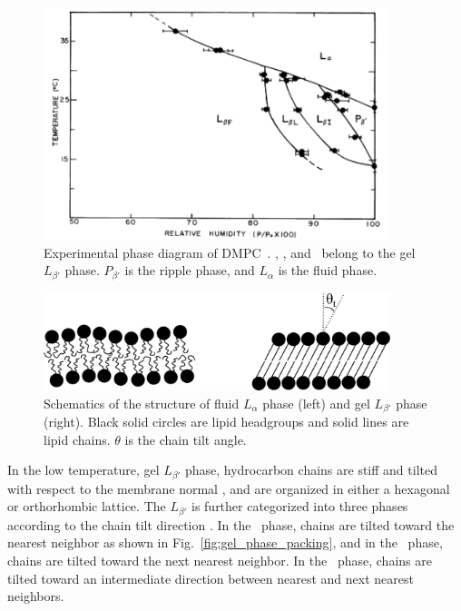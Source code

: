 \begin{figure}[htbp]
  \centering
  \includegraphics[width=0.9\textwidth]{figures/smith_phase_diagram}
  \caption{Experimental phase diagram of DMPC~\cite{ref:Smith88}.
  \LbetaI, \LbetaL, and \LbetaF\ belong to the gel $L_{\beta'}$ phase. $P_{\beta'}$ is 
  the ripple phase, and $L_\alpha$ is the fluid phase.}
  \label{fig:phase_diagram}
\end{figure}

\begin{figure}[htbp]
  \centering
  \includegraphics[width=0.9\textwidth]{figures/various_phases}
  \caption[]{Schematics of the structure of fluid $L_\alpha$ phase (left) and 
  gel $L_{\beta'}$ phase (right). Black solid circles are lipid headgroups 
  and solid lines are lipid chains. $\theta$ is the chain tilt angle.}
  \label{fig:various_phases}
\end{figure}

In the low temperature, gel $L_{\beta'}$
phase, hydrocarbon chains are stiff and tilted with respect to the membrane
normal \cite{ref:Tardieu73}, and are organized in either a hexagonal 
or orthorhombic lattice. 
The $L_{\beta'}$ is further categorized into three phases according to the 
chain tilt direction \cite{ref:Smith88,ref:Tristram93,Tristram-Nagle02}. 
In the \LbetaI\ phase, chains are tilted toward the 
nearest neighbor as shown in Fig.~\ref{fig:gel_phase_packing}, and
in the \LbetaF\ phase, chains are tilted toward the next nearest neighbor.
In the \LbetaL\ phase, chains are tilted toward an intermediate direction
between nearest and next nearest neighbors.

